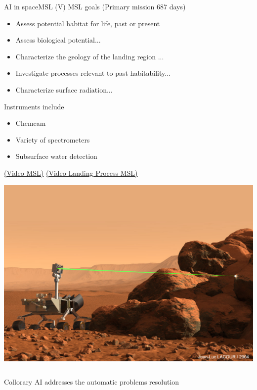 \documentclass[10pt,compress]{beamer} %
\begin{document}
{	\begin{frame}{AI in space}{MSL (V)}
		MSL goals (Primary mission 687 days)
		\begin{itemize}
			\item Assess potential habitat for life, past or present
			\item Assess biological potential...
			\item Characterize the geology of the landing region ...
			\item Investigate processes relevant to past habitability...
			\item Characterize surface radiation...
		\end{itemize}
		Instruments include
		\begin{itemize}
			\item Chemcam
			\item Variety of spectrometers 
			\item Subsurface water detection
		\end{itemize}
		\href{https://www.youtube.com/watch?v=p-ho4IU30Ac}{(Video MSL)}
		\href{https://www.youtube.com/watch?v=Ki_Af_o9Q9s}{(Video Landing Process MSL)}

		\vspace{-3cm}
		\begin{flushright}
			\includegraphics[width=0.4\linewidth]{figs/chemcam.jpg}
		\end{flushright}
	\end{frame}
}{}

\begin{frame}[plain]{}
	\begin{columns}
			\begin{block}{Collorary}
			AI addresses the automatic problems resolution
			\end{block}
	\end{columns}
\end{frame}

\end{document}
